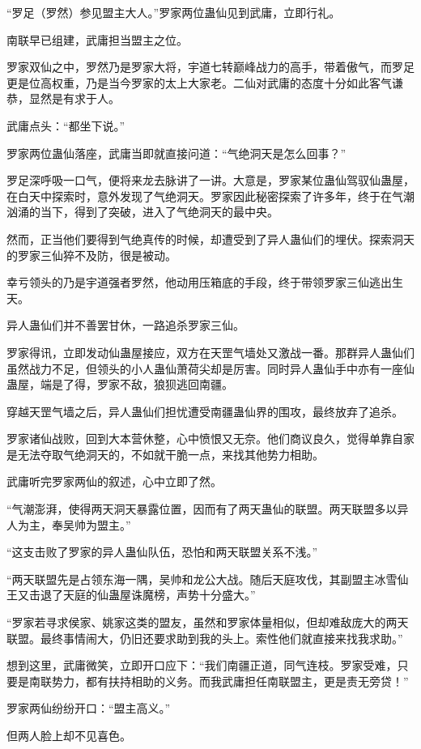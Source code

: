 \begin{this_body}
“罗足（罗然）参见盟主大人。”罗家两位蛊仙见到武庸，立即行礼。

南联早已组建，武庸担当盟主之位。

罗家双仙之中，罗然乃是罗家大将，宇道七转巅峰战力的高手，带着傲气，而罗足更是位高权重，乃是当今罗家的太上大家老。二仙对武庸的态度十分如此客气谦恭，显然是有求于人。

武庸点头：“都坐下说。”

罗家两位蛊仙落座，武庸当即就直接问道：“气绝洞天是怎么回事？”

罗足深呼吸一口气，便将来龙去脉讲了一讲。大意是，罗家某位蛊仙驾驭仙蛊屋，在白天中探索时，意外发现了气绝洞天。罗家因此秘密探索了许多年，终于在气潮汹涌的当下，得到了突破，进入了气绝洞天的最中央。

然而，正当他们要得到气绝真传的时候，却遭受到了异人蛊仙们的埋伏。探索洞天的罗家三仙猝不及防，很是被动。

幸亏领头的乃是宇道强者罗然，他动用压箱底的手段，终于带领罗家三仙逃出生天。

异人蛊仙们并不善罢甘休，一路追杀罗家三仙。

罗家得讯，立即发动仙蛊屋接应，双方在天罡气墙处又激战一番。那群异人蛊仙们虽然战力不足，但领头的小人蛊仙萧荷尖却是厉害。同时异人蛊仙手中亦有一座仙蛊屋，端是了得，罗家不敌，狼狈逃回南疆。

穿越天罡气墙之后，异人蛊仙们担忧遭受南疆蛊仙界的围攻，最终放弃了追杀。

罗家诸仙战败，回到大本营休整，心中愤恨又无奈。他们商议良久，觉得单靠自家是无法夺取气绝洞天的，不如就干脆一点，来找其他势力相助。

武庸听完罗家两仙的叙述，心中立即了然。

“气潮澎湃，使得两天洞天暴露位置，因而有了两天蛊仙的联盟。两天联盟多以异人为主，奉吴帅为盟主。”

“这支击败了罗家的异人蛊仙队伍，恐怕和两天联盟关系不浅。”

“两天联盟先是占领东海一隅，吴帅和龙公大战。随后天庭攻伐，其副盟主冰雪仙王又击退了天庭的仙蛊屋诛魔榜，声势十分盛大。”

“罗家若寻求侯家、姚家这类的盟友，虽然和罗家体量相似，但却难敌庞大的两天联盟。最终事情闹大，仍旧还要求助到我的头上。索性他们就直接来找我求助。”

想到这里，武庸微笑，立即开口应下：“我们南疆正道，同气连枝。罗家受难，只要是南联势力，都有扶持相助的义务。而我武庸担任南联盟主，更是责无旁贷！”

罗家两仙纷纷开口：“盟主高义。”

但两人脸上却不见喜色。


\end{this_body}
